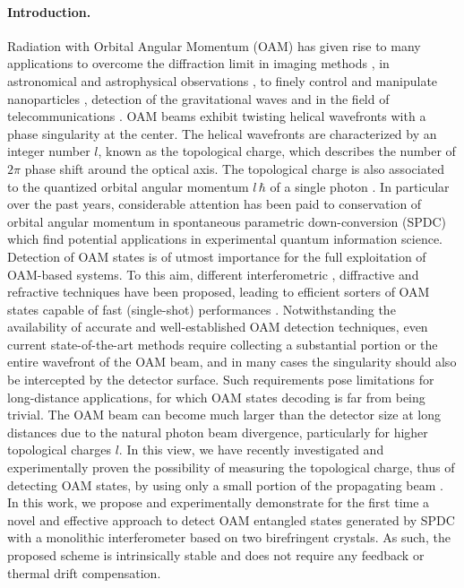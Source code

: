 \documentclass[
reprint,
amsmath,amssymb,
aps,
showkeys
]{revtex4-2}
\begin{document}
\maketitle


\paragraph*{\label{sec:introduction} Introduction.}
Radiation with Orbital Angular Momentum (OAM) \cite{Allen1992} has given rise to many applications to overcome the diffraction limit in imaging methods \cite{Tamburini2006}, in astronomical and astrophysical observations \cite{Tamburini2011,Berkhout2008}, to finely control and manipulate nanoparticles \cite{Ma2017}, detection of the gravitational waves \cite{Mours2006} and in the field of telecommunications \cite{Yan2014,Krenn2014,Xie2016}.
OAM beams exhibit twisting helical wavefronts with a phase singularity at the center.
The helical wavefronts are characterized by an integer number $l$, known as the topological charge, which describes the number of $2\pi$ phase shift around the optical axis.
The topological charge is also associated to the quantized orbital angular momentum $l\,\hbar$ of a single photon \cite{Mair2001}.
In particular over the past years, considerable attention has been paid to conservation of orbital angular momentum in spontaneous parametric down-conversion (SPDC) \cite{Mair2001,Frankie2002,Barbosa2007,Feng2008} which find potential applications in experimental quantum information science.
Detection of OAM states is of utmost importance for the full exploitation of OAM-based systems.
To this aim, different interferometric \cite{Vickers2008,Shen2013,Zhou2014}, diffractive \cite{Ruffato2017} and refractive \cite{Lavery2012,Li2017} techniques have been proposed, leading to efficient sorters of OAM states \cite{Berkhout2010,Mirhosseini2013} capable of fast (single-shot) performances \cite{Kulkarni2017}.
Notwithstanding the availability of accurate and well-established OAM detection techniques, even current state-of-the-art methods require collecting a substantial portion or the entire wavefront of the OAM beam, and in many cases the singularity should also be intercepted by the detector surface.
Such requirements pose limitations for long-distance applications, for which OAM states decoding is far from being trivial. The OAM beam can become much larger than the detector size at long distances due to the natural photon beam divergence, particularly for higher topological charges $l$.
In this view, we have recently investigated and experimentally proven the possibility of measuring the topological charge, thus of detecting OAM states, by using only a small portion of the propagating beam \cite{Paroli2021,Paroli2020,Paroli2020b,Paroli2022}.
In this work, we propose and experimentally demonstrate for the first time a novel and effective approach to detect OAM entangled states generated by SPDC with a monolithic interferometer based on two birefringent crystals.
As such, the proposed scheme is intrinsically stable and does not require any feedback or thermal drift compensation.
\end{document}
